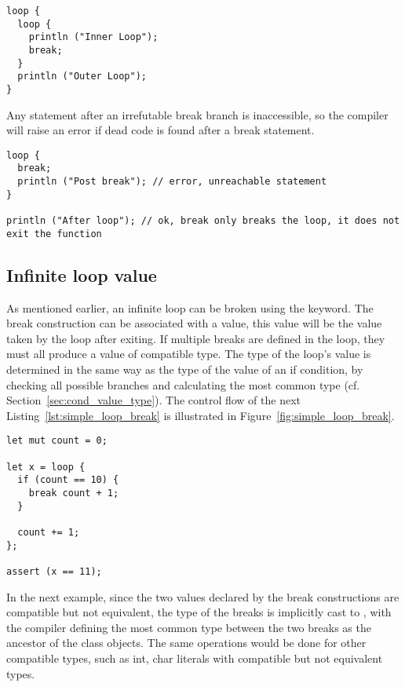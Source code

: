 \begin{lstlisting}[style=coloredverbatim, escapechar=@]
loop {
  loop {
    println ("Inner Loop");
    break;
  }
  println ("Outer Loop");
}
\end{lstlisting}

Any statement after an irrefutable break branch is inaccessible, so the compiler
will raise an error if dead code is found after a break statement.

\begin{lstlisting}[style=coloredverbatim, escapechar=@]
loop {
  break;
  println ("Post break"); // error, unreachable statement
}

println ("After loop"); // ok, break only breaks the loop, it does not exit the function
\end{lstlisting}

\subsection {Infinite loop value}

As mentioned earlier, an infinite loop can be broken using the 
keyword. The break construction can be associated with a value, this value will
be the value taken by the loop after exiting. If multiple breaks are defined in
the loop, they must all produce a value of compatible type. The type of the
loop's value is determined in the same way as the type of the value of an if
condition, by checking all possible branches and calculating the most common
type (cf. Section~\ref{sec:cond_value_type}). The control flow of the next
Listing~\ref{lst:simple_loop_break} is illustrated in
Figure~\ref{fig:simple_loop_break}.

\begin{lstlisting}[style=coloredverbatim, label=lst:simple_loop_break, caption=Breaking a loop with a value]
let mut count = 0;

let x = loop {
  if (count == 10) {
    break count + 1;
  }

  count += 1;
};

assert (x == 11);
\end{lstlisting}




In the next example, since the two values declared by the break
constructions are compatible but not equivalent, the type of the breaks is
implicitly cast to , with the compiler defining the most common type
between the two breaks as the ancestor of the class objects. The same operations
would be done for other compatible types, such as int, char literals with
compatible but not equivalent types.

